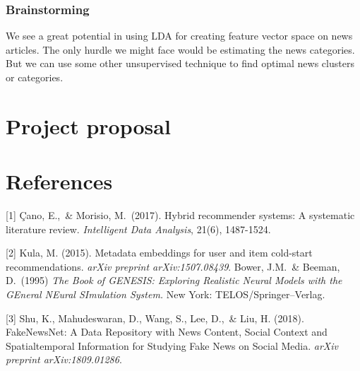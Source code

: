 \documentclass{article}
\begin{document}
\subsubsection{Brainstorming}

We see a great potential in using LDA for creating feature vector space on news articles. The only hurdle we might face would be estimating the news categories. But we can use some other unsupervised technique to find optimal news clusters or categories.


\section{Project proposal}
\label{gen_inst}

\section*{References}

[1] Çano, E.,\ \& Morisio, M.\ (2017). Hybrid recommender systems: A systematic literature review. {\it Intelligent Data Analysis}, 21(6), 1487-1524.

[2] Kula, M. (2015). Metadata embeddings for user and item cold-start recommendations. {\it arXiv preprint arXiv:1507.08439}.
Bower, J.M.\ \& Beeman, D.\ (1995) {\it The Book of GENESIS: Exploring
  Realistic Neural Models with the GEneral NEural SImulation System.}  New York:
TELOS/Springer--Verlag.

[3] Shu, K., Mahudeswaran, D., Wang, S., Lee, D.,\ \& Liu, H. (2018). FakeNewsNet: A Data Repository with News Content, Social Context and Spatialtemporal Information for Studying Fake News on Social Media. {\it arXiv preprint arXiv:1809.01286}.
\end{document}
